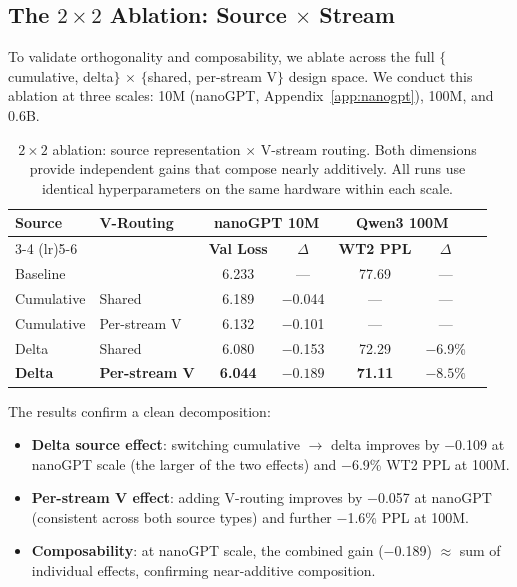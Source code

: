 \documentclass{article}
\begin{document}
\subsection{The $2 \times 2$ Ablation: Source $\times$ Stream}
\label{sec:ablation}

To validate orthogonality and composability, we ablate across the full $\{$cumulative, delta$\}$ $\times$ $\{$shared, per-stream V$\}$ design space. We conduct this ablation at three scales: 10M (nanoGPT, Appendix~\ref{app:nanogpt}), 100M, and 0.6B.

\begin{table}[t]
\centering
\caption{$2 \times 2$ ablation: source representation $\times$ V-stream routing. Both dimensions provide independent gains that compose nearly additively. All runs use identical hyperparameters on the same hardware within each scale.}
\label{tab:ablation}
\begin{tabular}{llccccc}
\toprule
\textbf{Source} & \textbf{V-Routing} & \multicolumn{2}{c}{\textbf{nanoGPT 10M}} & \multicolumn{2}{c}{\textbf{Qwen3 100M}} \\
\cmidrule(lr){3-4} \cmidrule(lr){5-6}
 & & \textbf{Val Loss} & \textbf{$\Delta$} & \textbf{WT2 PPL} & \textbf{$\Delta$} \\
\midrule
\multicolumn{2}{l}{Baseline} & 6.233 & --- & 77.69 & --- \\
\midrule
Cumulative & Shared & 6.189 & $-$0.044 & --- & --- \\
Cumulative & Per-stream V & 6.132 & $-$0.101 & --- & --- \\
\midrule
Delta & Shared & 6.080 & $-$0.153 & 72.29 & $-$6.9\% \\
\textbf{Delta} & \textbf{Per-stream V} & \textbf{6.044} & $\mathbf{-0.189}$ & \textbf{71.11} & $\mathbf{-8.5\%}$ \\
\bottomrule
\end{tabular}
\end{table}


The results confirm a clean decomposition:
\begin{itemize}
    \item \textbf{Delta source effect}: switching cumulative $\to$ delta improves by $-$0.109 at nanoGPT scale (the larger of the two effects) and $-$6.9\% WT2 PPL at 100M.
    \item \textbf{Per-stream V effect}: adding V-routing improves by $-$0.057 at nanoGPT (consistent across both source types) and further $-$1.6\% PPL at 100M.
    \item \textbf{Composability}: at nanoGPT scale, the combined gain ($-$0.189) $\approx$ sum of individual effects, confirming near-additive composition.
\end{itemize}
\end{document}
